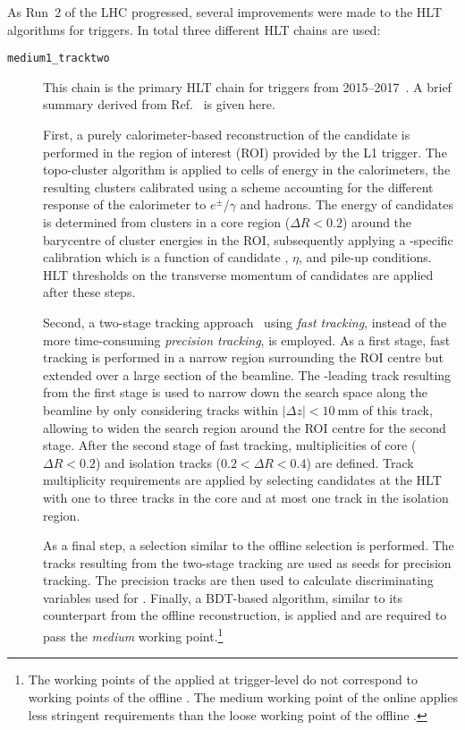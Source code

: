 As Run~2 of the LHC progressed, several improvements were made to the
HLT algorithms for \tauhadvis triggers. In total three different
\tauhadvis HLT chains are used:
\begin{description}

\item[\texttt{medium1\_tracktwo}] This chain is the primary HLT chain
  for \tauhadvis triggers from
  2015--2017~\cite{ATL-DAQ-PUB-2016-001,ATL-DAQ-PUB-2017-001,ATL-DAQ-PUB-2018-002}. A
  brief summary derived from Ref.~\cite{ATLAS-CONF-2017-061} is given
  here.

  First, a purely calorimeter-based reconstruction of the \tauhadvis
  candidate is performed in the region of interest (ROI) provided by
  the L1 trigger. The topo-cluster algorithm is applied to cells of
  energy in the calorimeters, the resulting clusters calibrated using
  a scheme accounting for the different response of the calorimeter to
  $e^\pm$/$\gamma$ and hadrons. The energy of \tauhadvis candidates is
  determined from clusters in a core region ($\Delta R < 0.2$) around
  the barycentre of cluster energies in the ROI, subsequently applying
  a \tauhadvis-specific calibration which is a function of \tauhadvis
  candidate \pT, $\eta$, and pile-up conditions. HLT thresholds on the
  transverse momentum of \tauhadvis candidates are applied after these
  steps.

  Second, a two-stage tracking
  approach~\cite{TRIG-2016-01,ATLAS-CONF-2017-061} using \emph{fast
    tracking}, instead of the more time-consuming \emph{precision
    tracking}, is employed. As a first stage, fast tracking is
  performed in a narrow region surrounding the \tauhadvis ROI centre
  but extended over a large section of the beamline. The \pT-leading
  track resulting from the first stage is used to narrow down the
  search space along the beamline by only considering tracks within
  $|\Delta z| < \SI{10}{\milli\metre}$ of this track, allowing to
  widen the search region around the ROI centre for the second
  stage. After the second stage of fast tracking, multiplicities of
  core ($\Delta R < 0.2$) and isolation tracks
  ($0.2 < \Delta R < 0.4$) are defined. Track multiplicity
  requirements are applied by selecting \tauhadvis candidates at the
  HLT with one to three tracks in the core and at most one track in
  the isolation region.

  As a final step, a \tauhadvis selection similar to the offline
  \tauhadvis selection is performed. The tracks resulting from the
  two-stage tracking are used as seeds for precision tracking. The
  precision tracks are then used to calculate discriminating variables
  used for \tauid. Finally, a BDT-based \tauid algorithm, similar to
  its counterpart from the offline \tauhadvis reconstruction, is
  applied and \tauhadvis are required to pass the \emph{medium}
  working point.\footnote{The working points of the \tauid applied at
    trigger-level do not correspond to working points of the offline
    \tauid. The medium working point of the online \tauid applies less
    stringent requirements than the loose working point of the offline
    \tauid.}


\end{description}
